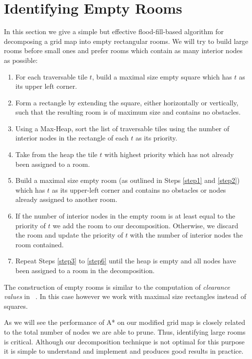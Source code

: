\section{Identifying Empty Rooms}
\label{empty rooms}
In this section we give a simple but effective flood-fill-based algorithm for decomposing a 
grid map into empty rectangular rooms.
We will try to build large rooms before small ones and prefer rooms which
contain as many interior nodes as possible:

\begin{enumerate}
\item{\label{step1} For each traversable tile $t$, build a maximal size empty square which has
$t$ as its upper left corner.}
\item{\label{step2} Form a rectangle by extending the square,
either horizontally or vertically, such that the resulting room is of maximum
size and contains no obstacles. }
\item{\label{step3} Using a Max-Heap, sort the list of traversable tiles using the number of
interior nodes in the rectangle of each $t$ as its priority.}
\item{\label{step4} Take from the heap the tile $t$ with highest priority
which has not already been assigned to a room. }
\item{\label{step5} Build a maximal size empty room (as outlined in Steps
\ref{step1} and \ref{step2}) which has $t$ as its upper-left corner and 
contains no obstacles or nodes already assigned to another room.}
\item{\label{step6} If the number of interior nodes in the empty room is at least equal to the priority 
of $t$ we add the room to our decomposition. 
Otherwise, we discard the room and update the priority of $t$ with the number of interior 
nodes the room contained. }
\item{\label{step7} Repeat Steps \ref{step3} to \ref{step6} until the heap is
empty and all nodes have been assigned to a room in the decomposition.}
\end{enumerate}

The construction of empty rooms is similar to the computation of \emph{clearance
values} in \citeauthor{harabor08}~. 
In this case however we work with maximal size rectangles instead of squares. 
\par
As we will see the performance of A* on our modified grid map is closely related to the total 
number of nodes we are able to prune.
Thus, identifying large rooms is critical.
Although our decomposition technique is not optimal for this purpose it is simple
to understand and implement and produces good results in practice.
